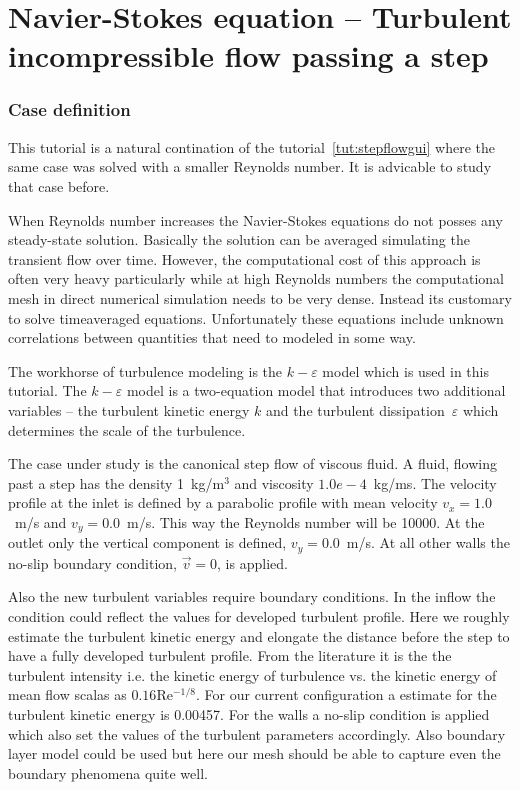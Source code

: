 \chapter{Navier-Stokes equation -- Turbulent incompressible flow passing a step}
\label{tut:stepflowke}



\subsection*{Case definition}

This tutorial is a natural contination of the tutorial~\ref{tut:stepflowgui}
where the same case was solved with a smaller Reynolds number. It is advicable 
to study that case before. 

When Reynolds number increases the 
Navier-Stokes equations do not posses any steady-state 
solution. Basically the solution can be averaged simulating the transient 
flow over time. However, the computational cost of this approach is often very 
heavy particularly while at high Reynolds numbers the computational mesh
in direct numerical simulation needs to be very dense. Instead its customary
to solve timeaveraged equations. Unfortunately these equations include 
unknown correlations between quantities that need to modeled in some way.

The workhorse of turbulence modeling is the $k-\varepsilon$ model which 
is used in this tutorial. The $k-\varepsilon$ model is a two-equation model
that introduces two additional variables -- the turbulent kinetic energy $k$ and the 
turbulent dissipation~$\varepsilon$
which determines the scale of the turbulence.

The case under study is the canonical step flow of viscous fluid. 
A fluid, flowing past a step has the density
1~kg/m$^3$ and viscosity $1.0e-4$~kg/ms. The velocity profile at the inlet is
defined by a parabolic profile with mean velocity 
$v_x=1.0$~m/s and $v_y=0.0$~m/s. 
This way the Reynolds number will be 10000.
At the outlet only 
the vertical component is defined, $v_y=0.0$~m/s. At all other
walls the no-slip boundary condition, $\vec{v}=0$, is applied. 

Also the new turbulent variables require boundary conditions. 
In the inflow the condition could reflect the values for developed turbulent
profile. Here we roughly estimate the turbulent kinetic energy and 
elongate the distance before the step 
to have a fully developed turbulent profile. 
From the literature it is the the turbulent intensity i.e. the 
kinetic energy of turbulence vs. the kinetic energy of mean flow 
scalas as $0.16$Re$^{-1/8}$. For our current configuration a estimate for the 
turbulent kinetic energy is 0.00457. 
For the walls a no-slip condition is applied which also set the values of the
turbulent parameters accordingly. Also boundary layer model could be used but here
our mesh should be able to capture even the boundary phenomena quite well. 

